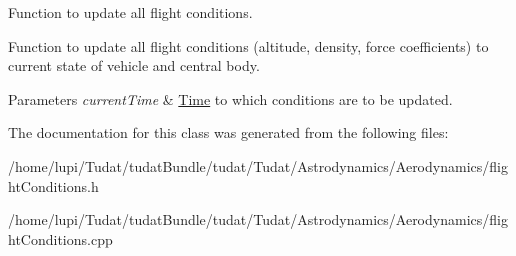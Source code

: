 Function to update all flight conditions. 

Function to update all flight conditions (altitude, density, force coefficients) to current state of vehicle and central body. 
\begin{DoxyParams}{Parameters}
{\em current\+Time} & \hyperlink{classtudat_1_1Time}{Time} to which conditions are to be updated. \\
\hline
\end{DoxyParams}


The documentation for this class was generated from the following files\+:\begin{DoxyCompactItemize}
\item 
/home/lupi/\+Tudat/tudat\+Bundle/tudat/\+Tudat/\+Astrodynamics/\+Aerodynamics/flight\+Conditions.\+h\item 
/home/lupi/\+Tudat/tudat\+Bundle/tudat/\+Tudat/\+Astrodynamics/\+Aerodynamics/flight\+Conditions.\+cpp\end{DoxyCompactItemize}
